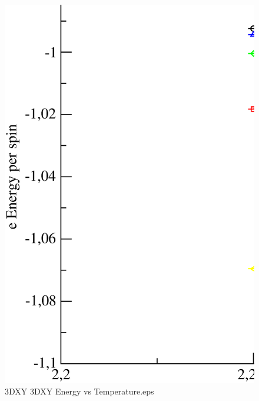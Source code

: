 \begin{figure}[!htpb]
  \centering
  \includegraphics[width=\textwidth]{./plots/3DXY/3DXY_Energy_vs_Temperature.eps}
  \caption{3DXY 3DXY Energy vs Temperature.eps}
\end{figure}

